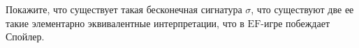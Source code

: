 Покажите, что существует такая бесконечная сигнатура $\sigma$, что существуют две ее такие элементарно
эквивалентные интерпретации, что в $\mathrm{EF}$-игре побеждает Спойлер.
